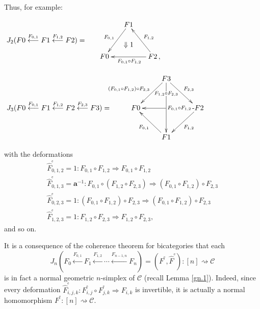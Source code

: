 \documentclass[]{amsart}
\begin{document}
Thus,  for example:

\noindent$\xymatrix@R=5pt@C=15pt{&&F1\ar[ddl]_{F_{0,1}}\ar@{}[dd]|>>>>>>{\textstyle \Downarrow 1}&\\  J_2(F0\overset{F_{0,1}}\longleftarrow F1\overset{F_{1,2}}\longleftarrow F2)=&&& \\
&F0&&\ar[uul]_{F_{1,2}} F2\,,\ar[ll]^{F_{0,1}\circ F_{1,2}}}$

\noindent$ \xymatrix { &
 & F3 \ar[dl]_{(F_{0,1}\circ F_{1,2})\circ F_{2,3}}  \ar[dd]|<<<<<<{F_{1,2}\circ F_{2,3} }\ar[dr]^{ F_{2,3}}& \\
 J_3(F0\overset{F_{0,1}}\longleftarrow F1\overset{F_{1,2}}\longleftarrow F2\overset{F_{2,3}}\longleftarrow F3)=&
F0   & & \text{-}F2 \ar[dl]^{ F_{1,2}} \ar[ll]|<<<<<<{\; F_{0,1}\circ F_{1,2}\;}\\
 && F1 \ar[ul]^{
F_{0,1}}} $

\noindent with the deformations
$$\begin{array}{l}
  \widehat{F}^{^{\mathrm e}}_{0,1,2}=1:F_{0,1}\circ F_{1,2}\Rightarrow F_{0,1}\circ F_{1,2}\\
\widehat{F}^{^{\mathrm e}}_{0,1,3}= \boldsymbol{a}^{-1}:F_{0,1}\circ (F_{1,2}\circ F_{2,3})\Rightarrow (F_{0,1}\circ F_{1,2})\circ F_{2,3}\\
\widehat{F}^{^{\mathrm e}}_{0,2,3}=1:(F_{0,1}\circ F_{1,2})\circ F_{2,3}\Rightarrow (F_{0,1}\circ F_{1,2})\circ F_{2,3}  \\
\widehat{F}^{^{\mathrm e}}_{1,2,3}=1:F_{1,2}\circ F_{2,3}\Rightarrow F_{1,2}\circ F_{2,3},
\end{array}
$$
and so on.

It is a consequence of the coherence theorem for bicategories that each
$$J_n(F_0\overset{F_{0,1}}\longleftarrow F_1 \overset{F_{1,2}}\longleftarrow \cdots
\overset{F_{n-1,n}} \longleftarrow F_n)=(F^{^{\mathrm e}},\widehat{F}^{^{\mathrm
e}}):[n]\rightsquigarrow {\ensuremath{\mathcal{C}}}$$ is in fact a normal geometric $n$-simplex of ${\ensuremath{\mathcal{C}}}$ (recall Lemma
\ref{gn.1}). Indeed, since every deformation $\widehat{F}^{^{\mathrm e}}_{i,j,k}:{F}^{^{\mathrm
e}}_{i,j}\circ {F}^{^{\mathrm e}}_{j,k}\Rightarrow {F}_{i,k}$ is invertible, it is actually  a
normal homomorphism  $F^{^{\mathrm e}}:[n]\rightsquigarrow{\ensuremath{\mathcal{C}}}$.
\end{document}
